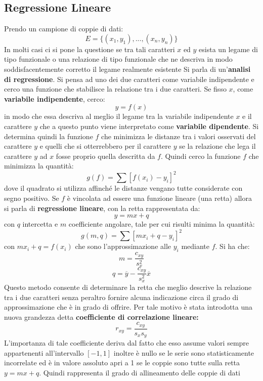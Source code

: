 \documentclass[a4paper,12pt, oneside]{book}
\begin{document}
\subsection{Regressione Lineare}
Prendo un campione di coppie di dati:
$$E=\{(x_1,y_1),...,(x_n,y_n)\}$$
In molti casi ci si pone la questione se tra tali caratteri $x$ ed $y$ esista un legame di tipo funzionale o una relazione di tipo funzionale che ne descriva in modo
soddisfacentemente corretto il legame realmente esistente Si parla di un'\textbf{analisi di regressione}. Si pensa ad uno dei due caratteri come variabile indipendente e cerco una funzione che stabilisce la relazione tra i due caratteri. Se fisso $x$, come \textbf{variabile indipendente}, cerco:
$$y=f(x)$$
in modo che essa descriva al meglio il legame tra la variabile indipendente $x$ e il carattere $y$ che a questo punto viene interpretato come \textbf{variabile dipendente}. Si determina quindi la funzione $f$ che minimizza le distanze tra i valori
osservati del carattere $y$ e quelli che si otterrebbero per il carattere $y$ se la relazione che lega il carattere $y$ ad $x$ fosse proprio quella descritta da $f$. Quindi cerco la funzione $f$ che minimizza la quantità:
$$g(f)=\sum[f(x_i)-y_i]^2$$
dove il quadrato si utilizza affinché le distanze vengano tutte considerate con segno positivo. Se $f$ è vincolata ad essere una funzione lineare (una retta) allora si parla di \textbf{regressione lineare}, con la retta rappresentata da:
$$y=mx+q$$
con $q$ intercetta e $m$ coefficiente angolare, tale per cui risulti minima la quantità:
$$g(m,q)=\sum[mx_i+q-y_i]^2$$
con $mx_i+q=f(x_i)$ che sono l'approssimazione alle $y_i$ mediante $f$. Si ha che:
$$m=\frac{c_{xy}}{s^2_x}$$
$$q=\overline{y}-\frac{c_{xy}}{s_x^2}\overline{x}$$
Questo metodo consente di determinare la retta che meglio descrive la relazione tra i due caratteri senza peraltro fornire alcuna indicazione circa il grado di approssimazione che è in grado di offrire. Per tale motivo è stata introdotta una nuova grandezza detta \textbf{coefficiente di correlazione lineare:}
$$r_{xy}=\frac{c_{xy}}{s_xs_y}$$
L'importanza di tale coefficiente deriva dal fatto che esso assume valori sempre
appartenenti all'intervallo $[-1, 1]$ inoltre è nullo se le serie sono statisticamente incorrelate ed è in valore assoluto apri a 1 se le coppie sono tutte sulla retta $y=mx+q$. Quindi rappresenta il grado di allineamento delle coppie di dati
\end{document}
